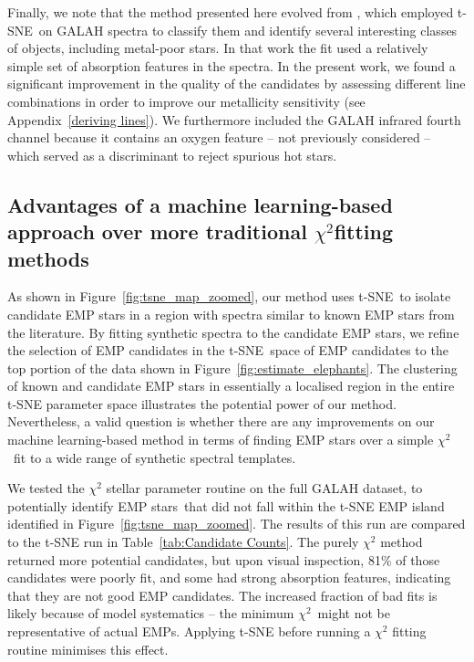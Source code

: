 \documentclass[]{aastex631}
\newcommand{\ts}{t-SNE\xspace}
\newcommand{\emps}{EMP stars\xspace}
\newcommand{\ci}{$\chi^2$\xspace}
\begin{document}
Finally, we note that the method presented here evolved from \citet{hughes2017}, which employed \ts\ on GALAH spectra to classify them and identify several interesting classes of objects, including metal-poor stars. In that work the fit used a relatively simple set of absorption features in the spectra. In the present work, we found a significant improvement in the quality of the candidates by assessing different line combinations in order to improve our metallicity sensitivity (see Appendix~\ref{deriving lines}). We furthermore included the GALAH infrared fourth channel because it contains an oxygen feature -- not previously considered -- which served as a discriminant to reject spurious hot stars.


\subsection{Advantages of a machine learning-based approach over more traditional \texorpdfstring{\ci}\ fitting methods } \label{Sec:Method Comparison}

As shown in Figure~\ref{fig:tsne_map_zoomed}, our method uses \ts\ to isolate candidate \emps in a region with spectra similar to known \emps from the literature. By fitting synthetic spectra to the candidate \emps, we refine the selection of EMP candidates in the \ts\ space of EMP candidates to the top portion of the data shown in Figure~\ref{fig:estimate_elephants}. The clustering of known and candidate \emps in essentially a localised region in the entire \ts parameter space illustrates the potential power of our method. Nevertheless, a valid question is whether there are any improvements on our machine learning-based method in terms of finding \emps over a simple \ci \ fit to a wide range of synthetic spectral templates.

We tested the \ci stellar parameter routine on the full GALAH dataset, to potentially identify \emps \ that did not fall within the \ts EMP island identified in Figure~\ref{fig:tsne_map_zoomed}. The results of this run are compared to the \ts run in Table~\ref{tab:Candidate Counts}. The purely \ci method returned more potential candidates, but upon visual inspection,  81\%  of those candidates were poorly fit, and some had strong absorption features, indicating that they are not good EMP candidates. The increased fraction of bad fits is likely because of model systematics -- the minimum \ci \ might not be representative of actual EMPs. Applying \ts before running a \ci fitting routine minimises this effect.
\end{document}
